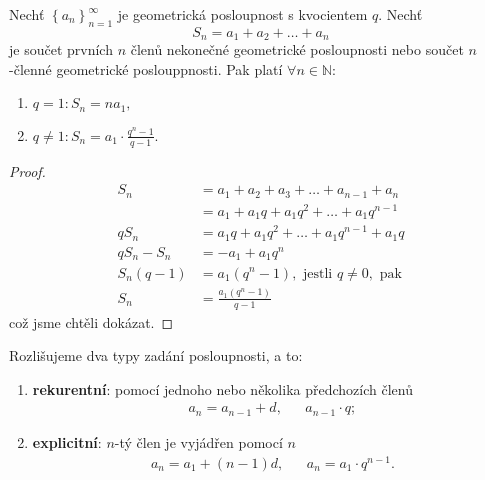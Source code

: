 \begin{veta}
Nechť $\left \{ a_n \right \}_{n=1}^\infty $ je geometrická posloupnost s kvocientem
$q$. Nechť
$$S_n=a_1+a_2+\dots+a_n$$
je součet prvních $n$ členů nekonečné geometrické posloupnosti nebo součet
$n$-členné geometrické poslouppnosti. Pak platí $\forall n \in \mathbb N$:
\begin{enumerate}[$i.$]
\item $q=1: S_n=na_1,$
\item $q\ne 1: S_n = a_1\cdot \frac{q^n-1}{q-1}.$
\end{enumerate}
\end{veta}

\begin{proof}
\begin{align*}
    S_n &= a_1+a_2+a_3+\dots+a_{n-1}+a_n \\
    &= a_1 + a_1q+ a_1q^2+ \dots + a_1q^{n-1}\\
    qS_n &= a_1q + a_1q^2 +  \dots + a_1q^{n-1} + a_1q\\
    qS_n-S_n &= -a_1+a_1q^n\\
    S_n(q-1) &= a_1(q^n-1), \textrm{ jestli } q\ne 0, \textrm{ pak}\\
    S_n &= \frac{a_1(q^n-1)}{q-1}
\end{align*}
což jsme chtěli dokázat. \qedhere
\end{proof}

\begin{pozn}
    Rozlišujeme dva typy zadání posloupnosti, a to:
    \begin{enumerate}[$i.$]
    \item \textbf{rekurentní}: pomocí jednoho nebo několika předchozích členů
    \begin{align*}
        a_n=a_{n-1}+d, & & a_{n-1}\cdot q;
    \end{align*}
   	\item \textbf{explicitní}: $n$-tý člen je vyjádřen pomocí $n$
    \begin{align*}
        a_n=a_1+(n-1)d, & & a_n = a_1\cdot q^{n-1}.
    \end{align*}
    \end{enumerate}
\end{pozn}
